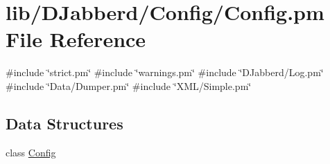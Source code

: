 \hypertarget{_config_8pm}{
\section{lib/\-D\-Jabberd/\-Config/\-Config.pm \-File \-Reference}
\label{_config_8pm}
}
{\ttfamily \#include \char`\"{}strict.\-pm\char`\"{}}\*
{\ttfamily \#include \char`\"{}warnings.\-pm\char`\"{}}\*
{\ttfamily \#include \char`\"{}\-D\-Jabberd/\-Log.\-pm\char`\"{}}\*
{\ttfamily \#include \char`\"{}\-Data/\-Dumper.\-pm\char`\"{}}\*
{\ttfamily \#include \char`\"{}\-X\-M\-L/\-Simple.\-pm\char`\"{}}\*
\subsection*{\-Data \-Structures}
\begin{DoxyCompactItemize}
\item 
class \hyperlink{class_d_jabberd_1_1_config_1_1_config}{\-Config}
\end{DoxyCompactItemize}
